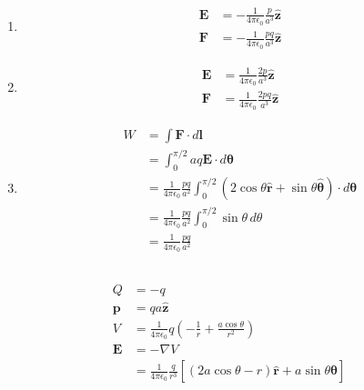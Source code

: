 \documentclass{article}
\renewcommand{\vec}[1]{\boldsymbol{\mathbf{#1}}}
\newcommand{\uvec}[1]{\hat{\vec{#1}}}
\newcommand{\ke}{\frac{1}{4 \pi \epsilon_0}}
\begin{document}
\begin{enumerate}
  \item

        \begin{align*}
          \vec{E} & = -\ke \frac{p}{a^3} \uvec{z}   \\
          \vec{F} & = -\ke \frac{p q}{a^3} \uvec{z}
        \end{align*}

  \item

        \begin{align*}
          \vec{E} & = \ke \frac{2 p}{a^3} \uvec{z}   \\
          \vec{F} & = \ke \frac{2 p q}{a^3} \uvec{z}
        \end{align*}

  \item

        \begin{align*}
          W & = \int \vec{F} \cdot d \vec{l}                                                                                   \\
            & = \int_0^{\pi / 2} a q \vec{E} \cdot d \vec{\theta}                                                              \\
            & = \ke \frac{p q}{a^2} \int_0^{\pi / 2} (2 \cos \theta \uvec{r} + \sin \theta \uvec{\theta}) \cdot d \vec{\theta} \\
            & = \ke \frac{p q}{a^2} \int_0^{\pi / 2} \sin \theta \,d \theta                                                    \\
            & = \ke \frac{p q}{a^2}
        \end{align*}
\end{enumerate}

\subsection{}

\begin{align*}
  Q       & = -q                                                                               \\
  \vec{p} & = q a \uvec{z}                                                                     \\
  V       & = \ke q \left( -\frac{1}{r} + \frac{a \cos \theta}{r^2} \right)                    \\
  \vec{E} & = -\nabla V                                                                        \\
          & = \ke \frac{q}{r^3} [(2 a \cos \theta - r) \uvec{r} + a \sin \theta \uvec{\theta}]
\end{align*}
\end{document}
